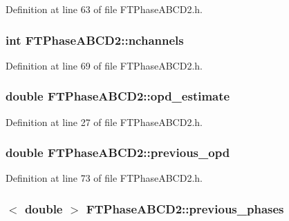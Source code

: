 Definition at line 63 of file FTPhaseABCD2.h.

\hypertarget{classFTPhaseABCD2_a5353d092d53889e894f4c9f215c879cf}{
\subsubsection[{nchannels}]{\setlength{\rightskip}{0pt plus 5cm}int {\bf FTPhaseABCD2::nchannels}}}
\label{classFTPhaseABCD2_a5353d092d53889e894f4c9f215c879cf}


Definition at line 69 of file FTPhaseABCD2.h.

\hypertarget{classFTPhaseABCD2_af1f0c943e60909356c5f9cc509c2612e}{
\subsubsection[{opd\_\-estimate}]{\setlength{\rightskip}{0pt plus 5cm}double {\bf FTPhaseABCD2::opd\_\-estimate}}}
\label{classFTPhaseABCD2_af1f0c943e60909356c5f9cc509c2612e}


Definition at line 27 of file FTPhaseABCD2.h.

\hypertarget{classFTPhaseABCD2_ac2491fdeea3af6651de745eed482db2b}{
\subsubsection[{previous\_\-opd}]{\setlength{\rightskip}{0pt plus 5cm}double {\bf FTPhaseABCD2::previous\_\-opd}}}
\label{classFTPhaseABCD2_ac2491fdeea3af6651de745eed482db2b}


Definition at line 73 of file FTPhaseABCD2.h.

\hypertarget{classFTPhaseABCD2_af6cf30f4e9241a2d546d76687be8520c}{
\subsubsection[{previous\_\-phases}]{$<$ double $>$ {\bf FTPhaseABCD2::previous\_\-phases}}}
\label{classFTPhaseABCD2_af6cf30f4e9241a2d546d76687be8520c}


